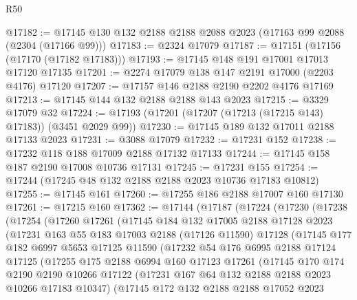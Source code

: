 \begin{lexlean}{R50}
\begin{coremodule}
@17182 := @17145 @130 @132 @2188 @2188 @2088 @2023 (@17163 @99 @2088 (@2304 (@17166 @99)))
@17183 := @2324 @17079
@17187 := @17151 (@17156 (@17170 (@17182 @17183)))
@17193 := @17145 @148 @191 @17001 @17013 @17120 @17135
@17201 := @2274 @17079 @138 @147 @2191 @17000 (@2203 @4176) @17120
@17207 := @17157 @146 @2188 @2190 @2202 @4176 @17169
@17213 := @17145 @144 @132 @2188 @2188 @143 @2023
@17215 := @3329 @17079 @32
@17224 := @17193 (@17201 (@17207 (@17213 (@17215 @143) @17183)) (@3451 @2029 @99))
@17230 := @17145 @189 @132 @17011 @2188 @17133 @2023
@17231 := @3088 @17079
@17232 := @17231 @152
@17238 := @17232 @118 @188 @17009 @2188 @17132 @17133
@17244 := @17145 @158 @187 @2190 @17008 @10736 @17131
@17245 := @17231 @155
@17254 := @17244 (@17245 @48 @132 @2188 @2188 @2023 @10736 @17183 @10812)
@17255 := @17145 @161
@17260 := @17255 @186 @2188 @17007 @160 @17130
@17261 := @17215 @160
@17362 := @17144
    (@17187
      (@17224
        (@17230
          (@17238
            (@17254
              (@17260
                @17261
                (@17145
                  @184
                  @132
                  @17005
                  @2188
                  @17128
                  @2023
                  (@17231
                    @163
                    @55
                    @183
                    @17003
                    @2188
                    (@17126 @11590)
                    @17128
                    (@17145
                      @177
                      @182
                      @6997
                      @5653
                      @17125
                      @11590
                      (@17232
                        @54
                        @176
                        @6995
                        @2188
                        @17124
                        @17125
                        (@17255
                          @175
                          @2188
                          @6994
                          @160
                          @17123
                          @17261
                          (@17145
                            @170
                            @174
                            @2190
                            @2190
                            @10266
                            @17122
                            (@17231 @167 @64 @132 @2188 @2188 @2023 @10266 @17183 @10347)
                            (@17145
                              @172
                              @132
                              @2188
                              @2188
                              @17052
                              @2023

\end{coremodule}
\end{lexlean}
